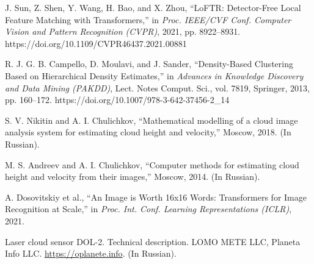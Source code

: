 \documentclass[preprint,
superscriptaddress,
amsmath,amssymb,aps,
twoside,final,secnumarabic,
nofootinbib]{revtex4-2}
\begin{document}
\begin{thebibliography}{}

J. Sun, Z. Shen, Y. Wang, H. Bao, and X. Zhou,
``LoFTR: Detector-Free Local Feature Matching with Transformers,''
in \emph{Proc. IEEE/CVF Conf. Computer Vision and Pattern Recognition (CVPR)},
2021, pp. 8922--8931.
https://doi.org/10.1109/CVPR46437.2021.00881

R. J. G. B. Campello, D. Moulavi, and J. Sander,
``Density-Based Clustering Based on Hierarchical Density Estimates,''
in \emph{Advances in Knowledge Discovery and Data Mining (PAKDD)},
Lect. Notes Comput. Sci., vol. 7819, Springer, 2013, pp. 160--172.
https://doi.org/10.1007/978-3-642-37456-2\_14

S. V. Nikitin and A. I. Chulichkov,
``Mathematical modelling of a cloud image analysis system for estimating cloud height and velocity,''
Moscow, 2018. (In Russian).

M. S. Andreev and A. I. Chulichkov,
``Computer methods for estimating cloud height and velocity from their images,''
Moscow, 2014. (In Russian).

A. Dosovitskiy et al.,
``An Image is Worth 16x16 Words: Transformers for Image Recognition at Scale,''
in \emph{Proc. Int. Conf. Learning Representations (ICLR)}, 2021.

Laser cloud sensor DOL-2. Technical description.
LOMO METE LLC, Planeta Info LLC.
\url{https://oplanete.info}. (In Russian).

\end{thebibliography}
\end{document}
